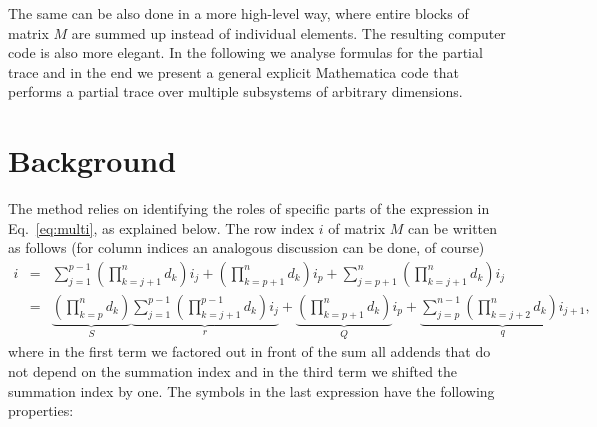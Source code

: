 \documentclass[nofootinbib,superscriptaddress,longbibliography,a4paper,amsfonts]{revtex4-2}
\begin{document}
The same can be also done in a more high-level way, where entire blocks of matrix $M$ are summed up instead of individual elements. The resulting computer code is also more elegant. In the following we analyse formulas for the partial trace and in the end we present a general explicit Mathematica code that performs a partial trace over multiple subsystems of arbitrary dimensions.

\section{Background}

The method relies on identifying the roles of specific parts of the expression in Eq.~\eqref{eq:multi}, as explained below. The row index $i$ of matrix $M$ can be written as follows (for column indices an analogous discussion can be done, of course)
\begin{eqnarray}
i & = & \sum_{j=1}^{p-1} \left( \prod_{k=j+1}^n d_k \right) i_j + \left( \prod_{k=p+1}^n d_k \right) i_p + \sum_{j=p+1}^{n} \left( \prod_{k=j+1}^n d_k \right) i_j \\
& = & \underbrace{\left( \prod_{k=p}^n d_k \right)}_{S} \underbrace{\sum_{j=1}^{p-1} \left( \prod_{k=j+1}^{p-1} d_k \right) i_j}_{r} + \underbrace{\left( \prod_{k=p+1}^n d_k \right)}_{Q} i_p + \underbrace{\sum_{j=p}^{n-1} \left( \prod_{k=j+2}^n d_k \right) i_{j+1}}_{q}, \label{eq:iindx}
\end{eqnarray}
where in the first term we factored out in front of the sum all addends that do not depend on the summation index and in the third term we shifted the summation index by one. The symbols in the last expression have the following properties:
\end{document}
